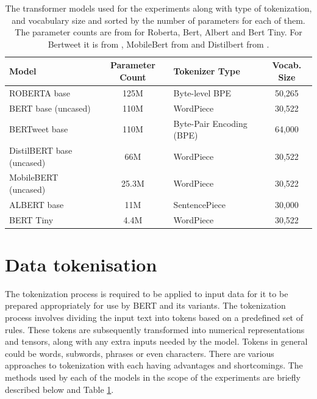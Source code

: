 \begin{table}[ht]
    \captionsetup{font=small}
    \centering
    \begin{tabularx}{\textwidth}{|l|c|X|c|}
        \hline
        \rowcolor[gray]{0.7}
        \textbf{Model}            & \textbf{Parameter Count} & \textbf{Tokenizer Type}  & \textbf{Vocab. Size} \\
        \hline
        ROBERTA base              & 125M                     & Byte-level BPE           & 50,265               \\
        \hline
        BERT base (uncased)       & 110M                     & WordPiece                & 30,522               \\
        \hline
        BERTweet base             & 110M                     & Byte-Pair Encoding (BPE) & 64,000               \\
        \hline
        DistilBERT base (uncased) & 66M                      & WordPiece                & 30,522               \\
        \hline
        MobileBERT (uncased)      & 25.3M                    & WordPiece                & 30,522               \\
        \hline
        ALBERT base               & 11M                      & SentencePiece            & 30,000               \\
        \hline
        BERT Tiny                 & 4.4M                     & WordPiece                & 30,522               \\
        \hline
    \end{tabularx}
    \caption{The transformer models used for the experiments along with type of tokenization, and vocabulary size and sorted by the number of parameters for each of them. The parameter counts are from \cite{bhargavaGeneralizationNLIWays2021} for Roberta, Bert, Albert and Bert Tiny. For Bertweet it is from \cite{nguyenBERTweetPretrainedLanguage2020}, MobileBert from \cite{sunMobileBERTCompactTaskAgnostic2020} and Distilbert from \cite{sanhDistilBERTDistilledVersion2020}.}
    \label{tab: model_dtls}
\end{table}

\section{Data tokenisation}
The tokenization process is required to be applied to input data for it to be prepared appropriately for use by BERT and its variants. The tokenization process involves dividing the input text into tokens based on a predefined set of rules. These tokens are subsequently transformed into numerical representations and tensors, along with any extra inputs needed by the model. Tokens in general could be words, subwords, phrases or even characters. There are various approaches to tokenization with each having advantages and shortcomings. The methods used by each of the models in the scope of the experiments are briefly described below and Table \ref{tab: model_dtls}.
\newline \newline
